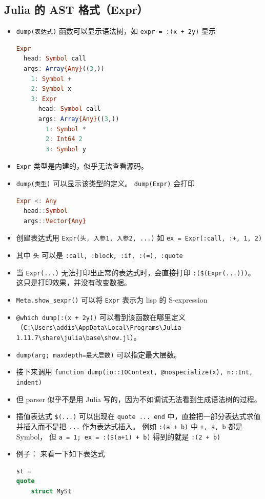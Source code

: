 \subsection{Julia 的 AST 格式（Expr）}
\begin{itemize}
\item \verb`dump(表达式)` 函数可以显示语法树，如 \verb`expr = :(x + 2y)` 显示
\begin{lstlisting}[language=julia]
Expr
  head: Symbol call
  args: Array{Any}((3,))
    1: Symbol +
    2: Symbol x
    3: Expr
      head: Symbol call
      args: Array{Any}((3,))
        1: Symbol *
        2: Int64 2
        3: Symbol y
\end{lstlisting}
\item \verb`Expr` 类型是内建的，似乎无法查看源码。
\item \verb`dump(类型)` 可以显示该类型的定义。 \verb`dump(Expr)` 会打印 
\begin{lstlisting}[language=julia]
Expr <: Any
  head::Symbol
  args::Vector{Any}
\end{lstlisting}
\item 创建表达式用 \verb`Expr(头, 入参1, 入参2, ...)` 如 \verb`ex = Expr(:call, :+, 1, 2)`
\item 其中 \verb`头` 可以是 \verb`:call, :block, :if, :(=), :quote`
\item 当 \verb`Expr(...)` 无法打印出正常的表达式时，会直接打印 \verb`:($(Expr(...)))`。 这只是打印效果，并没有改变数据。
\item \verb`Meta.show_sexpr()` 可以将 \verb`Expr` 表示为 lisp 的 S-expression
\item \verb`@which dump(:(x + 2y))` 可以看到该函数在哪里定义（\verb`C:\Users\addis\AppData\Local\Programs\Julia-1.11.7\share\julia\base\show.jl`）。
\item \verb`dump(arg; maxdepth=最大层数)` 可以指定最大层数。
\item 接下来调用 \verb`function dump(io::IOContext, @nospecialize(x), n::Int, indent)`
\item 但 parser 似乎不是用 Julia 写的，因为不如调试无法看到生成语法树的过程。
\item 插值表达式 \verb`$(...)` 可以出现在 \verb`quote ... end` 中，直接把一部分表达式求值并插入而不是把 \verb`...` 作为表达式插入。 例如 \verb`:(a + b)` 中 \verb`+, a, b` 都是 Symbol， 但 \verb`a = 1; ex = :($(a+1) + b)` 得到的就是 \verb`:(2 + b)`
\item 例子：
来看一下如下表达式
\begin{lstlisting}[language=julia]
st = 
quote
    struct MySt

\end{lstlisting}
\end{itemize}
